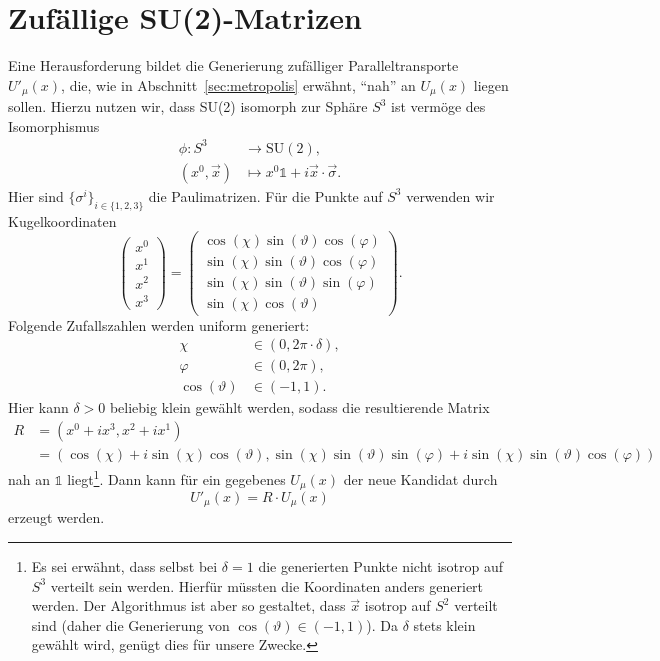 \section{Zufällige SU(2)-Matrizen} \label{sec:randomSU2}
Eine Herausforderung bildet die Generierung zufälliger Paralleltransporte $U'_\mu(x)$,
die, wie in Abschnitt~\ref{sec:metropolis} erwähnt, \enquote{nah} an $U_\mu(x)$ liegen
sollen. Hierzu nutzen wir, dass SU(2) isomorph zur Sphäre $S^3$ ist vermöge des
Isomorphismus \cite{urbachCPscript}
\begin{align*}
    \phi: S^3 &\rightarrow \mathrm{SU}(2),\\
    (x^0, \vec{x}) &\mapsto x^0 \mathds{1} + i \vec{x} \cdot \vec{\sigma}.
\end{align*}
Hier sind $\{\sigma^i\}_{i \in \{1,2,3\}}$ die Paulimatrizen. Für die Punkte auf $S^3$
verwenden wir Kugelkoordinaten
\[
    \begin{pmatrix}
    x^0 \\
    x^1 \\
    x^2 \\
    x^3
    \end{pmatrix}
    =
    \begin{pmatrix}
    \cos(\chi) \sin(\vartheta) \cos(\varphi) \\
    \sin(\chi) \sin(\vartheta) \cos(\varphi) \\
    \sin(\chi) \sin(\vartheta) \sin(\varphi) \\
    \sin(\chi) \cos(\vartheta)
    \end{pmatrix}.
\]
Folgende Zufallszahlen werden uniform generiert:
\begin{align*}
    \chi &\in (0, 2 \pi \cdot \delta),\\
    \varphi &\in (0, 2 \pi),\\
    \cos(\vartheta) &\in (-1,1).
\end{align*}
Hier kann $\delta > 0$ beliebig klein gewählt werden, sodass die resultierende
Matrix
\begin{align*}
    R &= (x^0 + i x^3, x^2 + i x^1) \\
    &= (\cos(\chi) + i \sin(\chi) \cos(\vartheta),
    \sin(\chi) \sin(\vartheta) \sin(\varphi) + i \sin(\chi) \sin(\vartheta) \cos(\varphi))
\end{align*}
nah an $\mathds{1}$ liegt\footnote{Es sei erwähnt, dass selbst bei
$\delta = 1$ die generierten Punkte nicht isotrop auf $S^3$ verteilt sein werden.
Hierfür müssten die Koordinaten anders generiert werden. Der Algorithmus ist aber
so gestaltet, dass $\vec{x}$ isotrop auf $S^2$ verteilt sind (daher die Generierung
von $\cos(\vartheta) \in (-1,1)$). Da $\delta$ stets klein gewählt wird, genügt
dies für unsere Zwecke.}. Dann kann
für ein gegebenes $U_\mu(x)$ der neue Kandidat durch
\[
    U'_\mu(x) = R \cdot U_\mu(x)
\]
erzeugt werden.

